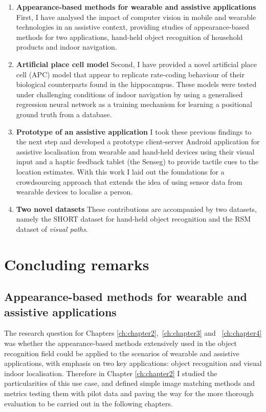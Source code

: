 \begin{enumerate}
\item \textbf{Appearance-based methods for wearable and assistive applications} First, I have analysed the impact of computer vision in mobile and wearable technologies in an assistive context, providing studies of appearance-based methods for two applications, hand-held object recognition of household products and indoor navigation.

\item \textbf{Artificial place cell model} Second, I have provided a novel artificial place cell (APC) model that appear to replicate rate-coding behaviour of their biological counterparts found in the hippocampus. These models were tested under challenging conditions of indoor navigation by using a generalised regression neural network as a training mechanism for learning a positional ground truth from a database.

\item \textbf{Prototype of an assistive application} I took these previous findings to the next step and developed a prototype client-server Android application for assistive localisation from wearable and hand-held devices using their visual input and a haptic feedback tablet (the Senseg\texttrademark) to provide tactile cues to the location estimates. With this work I laid out the foundations for a crowdsourcing approach that extends the idea of using sensor data from wearable devices to localise a person.

\item \textbf{Two novel datasets} These contributions are accompanied by two datasets, namely the SHORT dataset for hand-held object recognition and the RSM dataset of \emph{visual paths}.
\end{enumerate}

\section{Concluding remarks}

\subsection{Appearance-based methods for wearable and assistive applications}

The research question for Chapters \ref{ch:chapter2},~\ref{ch:chapter3} and ~\ref{ch:chapter4} was whether the appearance-based methods extensively used in the object recognition field could be applied to the scenarios of wearable and assistive applications, with emphasis on two key applications: object recognition and visual indoor localisation. Therefore in Chapter \ref{ch:chapter2} I studied the particularities of this use case, and defined simple image matching methods and metrics testing them with pilot data and paving the way for the more thorough evaluation to be carried out in the following chapters.

